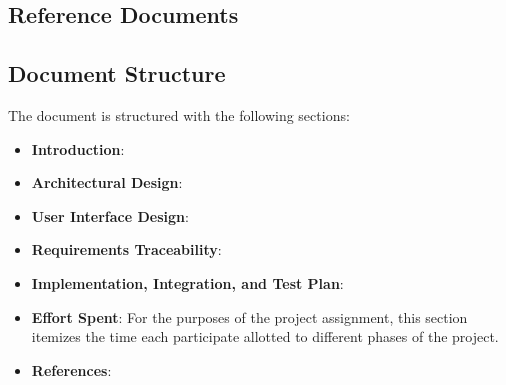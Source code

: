 \subsection{Reference Documents}
\subsection{Document Structure}
The document is structured with the following sections:
\begin{itemize}
\item \textbf{Introduction}:
\item \textbf{Architectural Design}:
\item \textbf{User Interface Design}:
\item \textbf{Requirements Traceability}:
\item \textbf{Implementation, Integration, and Test Plan}:
\item \textbf{Effort Spent}: For the purposes of the project assignment, this section itemizes the time each participate allotted to different phases of the project. 
\item \textbf{References}:
\end{itemize}




